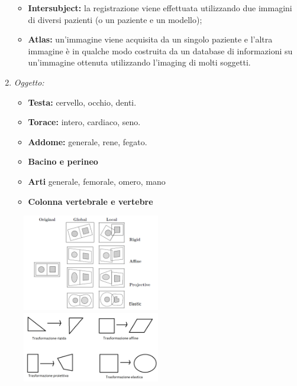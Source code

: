 \begin{enumerate}
\begin{itemize}
              \item \textbf{Intersubject:} la registrazione viene effettuata utilizzando due
                    immagini di diversi pazienti (o un paziente e un modello);
              \item \textbf{Atlas:} un'immagine viene acquisita da un singolo paziente e
                    l'altra immagine è in qualche modo costruita da un database
                    di informazioni su un'immagine ottenuta utilizzando l'imaging
                    di molti soggetti.
          \end{itemize}
    \item \textit{Oggetto:}
          \begin{itemize}
              \item \textbf{Testa:} cervello, occhio, denti.
              \item \textbf{Torace:} intero, cardiaco, seno.
              \item \textbf{Addome:} generale, rene, fegato.
              \item \textbf{Bacino e perineo}
              \item \textbf{Arti} generale, femorale, omero, mano
              \item \textbf{Colonna vertebrale e vertebre}
          \end{itemize}
\end{enumerate}

\begin{figure}[H]
    \centering
    \includegraphics[width=6cm, keepaspectratio]{capitoli/immagini/imgs/dominio.png}
    \includegraphics[width=6cm, keepaspectratio]{capitoli/immagini/imgs/tipi-trasformazione.png}
\end{figure}

